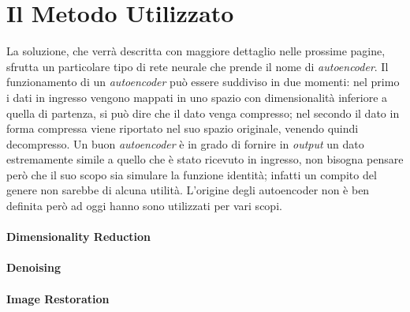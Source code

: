 %
%
%
%

\section{Il Metodo Utilizzato}
La soluzione, che verrà descritta con maggiore dettaglio nelle prossime pagine, sfrutta un particolare tipo di rete neurale che prende il nome di \textit{autoencoder}.
Il funzionamento di un \textit{autoencoder} può essere suddiviso in due momenti:
nel primo i dati in ingresso vengono mappati in uno spazio con dimensionalità inferiore a quella di partenza, si può dire che il dato venga compresso;
nel secondo il dato in forma compressa viene riportato nel suo spazio originale, venendo quindi decompresso.
Un buon \textit{autoencoder} è in grado di fornire in \textit{output} un dato estremamente simile a quello che è stato ricevuto in ingresso, non bisogna pensare però che il suo scopo sia simulare la funzione identità; infatti un compito del genere non sarebbe di alcuna utilità.
L'origine degli autoencoder non è ben definita però ad oggi hanno sono utilizzati per vari scopi.


\paragraph{Dimensionality Reduction}

\paragraph{Denoising}

\paragraph{Image Restoration}

